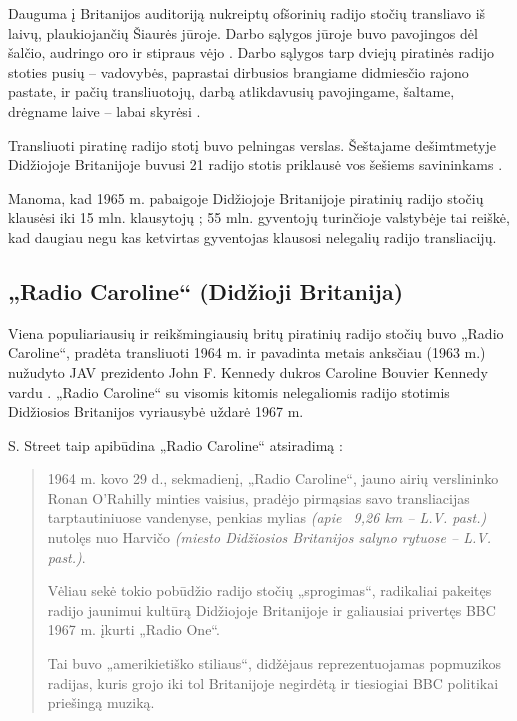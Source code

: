 \documentclass[kursinis-darbas]{vukf}
\begin{document}
Dauguma į Britanijos auditoriją nukreiptų ofšorinių radijo stočių transliavo iš laivų, plaukiojančių Šiaurės jūroje. Darbo sąlygos jūroje buvo pavojingos dėl šalčio, audringo oro ir stipraus vėjo \cite[p.~238]{chs_encyclopedia_of_radio}. Darbo sąlygos tarp dviejų piratinės radijo stoties pusių – vadovybės, paprastai dirbusios brangiame didmiesčio rajono pastate, ir pačių transliuotojų, darbą atlikdavusių pavojingame, šaltame, drėgname laive – labai skyrėsi \cite[p.~238]{chs_encyclopedia_of_radio}.

Transliuoti piratinę radijo stotį buvo pelningas verslas. Šeštajame dešimtmetyje Didžiojoje Britanijoje buvusi 21 radijo stotis \cite[p.~139]{hc_key_concepts_in_radio_studies} priklausė vos šešiems savininkams \cite[p.~238]{chs_encyclopedia_of_radio}.

Manoma, kad 1965 m. pabaigoje Didžiojoje Britanijoje piratinių radijo stočių klausėsi iki 15 mln. klausytojų \cite[p.~447]{js_continuum_encyclopedia} \cite{bbc_radio_4_do_pirates_rule_the_air_waves}; 55 mln. gyventojų turinčioje valstybėje \cite{uk_population_1965} tai reiškė, kad daugiau negu kas ketvirtas gyventojas klausosi nelegalių radijo transliacijų.


\subsection{„Radio Caroline“ (Didžioji Britanija)}

Viena populiariausių ir reikšmingiausių britų piratinių radijo stočių buvo „Radio Caroline“, pradėta transliuoti 1964 m. ir pavadinta metais anksčiau (1963 m.) nužudyto JAV prezidento John F. Kennedy dukros Caroline Bouvier Kennedy vardu \cite[p.~238]{chs_encyclopedia_of_radio}. „Radio Caroline“ su visomis kitomis nelegaliomis radijo stotimis Didžiosios Britanijos vyriausybė uždarė 1967 m.

S. Street taip apibūdina „Radio Caroline“ atsiradimą \cite[p.~202]{ss_crossing_the_ether_british_public_service_radio_and_commercial_competition}:

\begin{quotation}
	1964 m. kovo 29 d., sekmadienį, „Radio Caroline“, jauno airių verslininko Ronan O'Rahilly minties vaisius, pradėjo pirmąsias savo transliacijas tarptautiniuose vandenyse, penkias mylias \emph{(apie ~9,26 km – L.V. past.)} nutolęs nuo Harvičo \emph{(miesto Didžiosios Britanijos salyno rytuose – L.V. past.)}.
	
	Vėliau sekė tokio pobūdžio radijo stočių „sprogimas“, radikaliai pakeitęs radijo jaunimui kultūrą Didžiojoje Britanijoje ir galiausiai privertęs \gls{BBC} 1967 m. įkurti „Radio One“.
	
	Tai buvo „amerikietiško stiliaus“, didžėjaus reprezentuojamas popmuzikos radijas, kuris grojo iki tol Britanijoje negirdėtą ir tiesiogiai \gls{BBC} politikai priešingą muziką.
\end{quotation}
\end{document}
